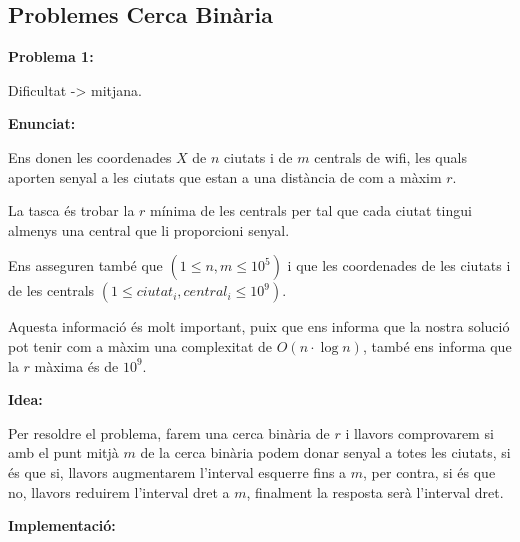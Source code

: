 \subsection{Problemes Cerca Binària}

\textbf{Problema 1:} \newline

Dificultat -> mitjana. \newline

\textbf{Enunciat:} \newline

Ens donen les coordenades $X$ de $n$ ciutats i de $m$ centrals de wifi, les quals aporten senyal a les ciutats que estan a una distància de com a màxim $r$.

La tasca és trobar la $r$ mínima de les centrals per tal que cada ciutat tingui almenys una central que li proporcioni senyal.

Ens asseguren també que $(1\leq n, m \leq 10^5)$ i que les coordenades de les ciutats i de les centrals
$(1\leq ciutat_{i}, central_{i} \leq 10^9) $.

Aquesta informació és molt important, puix que ens informa que la nostra solució pot tenir com a màxim una complexitat de $O(n \cdot \log n)$, també ens informa que la $r$ màxima és de $10^9$. \newline

\textbf{Idea:} \newline

Per resoldre el problema, farem una cerca binària de $r$ i llavors comprovarem si amb el punt mitjà $m$ de la cerca binària podem donar senyal a totes les ciutats, si és que si, llavors augmentarem l'interval esquerre fins a $m$, per contra, si és que no, llavors reduirem l'interval dret a $m$, finalment la resposta serà l'interval dret.
\newline

\textbf{Implementació:} \newline

